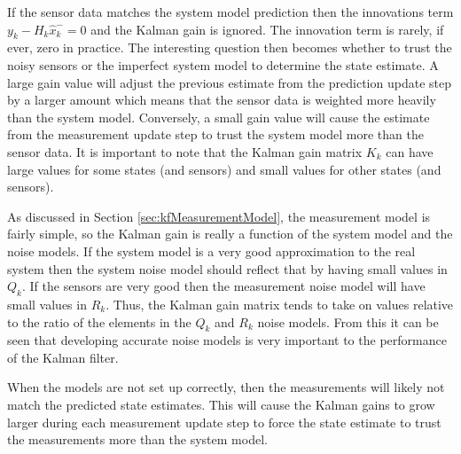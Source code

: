 If the sensor data matches the system model prediction then the innovations term $y_k-H_k\hat{x}_k^-=0$ and the Kalman gain is ignored. The innovation term is rarely, if ever, zero in practice. The interesting question then becomes whether to trust the noisy sensors or the imperfect system model to determine the state estimate. A large gain value will adjust the previous estimate from the prediction update step by a larger amount which means that the sensor data is weighted more heavily than the system model. Conversely, a small gain value will cause the estimate from the measurement update step to trust the system model more than the sensor data. It is important to note that the Kalman gain matrix $K_k$ can have large values for some states (and sensors) and small values for other states (and sensors).

As discussed in Section \ref{sec:kfMeasurementModel}, the measurement model is fairly simple, so the Kalman gain is really a function of the system model and the noise models. If the system model is a very good approximation to the real system then the system noise model should reflect that by having small values in $Q_k$. If the sensors are very good then the measurement noise model will have small values in $R_k$. Thus, the Kalman gain matrix tends to take on values relative to the ratio of the elements in the $Q_k$ and $R_k$ noise models. From this it can be seen that developing accurate noise models is very important to the performance of the Kalman filter.

When the models are not set up correctly, then the measurements will likely not match the predicted state estimates. This will cause the Kalman gains to grow larger during each measurement update step to force the state estimate to trust the measurements more than the system model.

